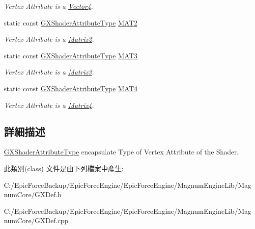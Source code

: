 \begin{DoxyCompactItemize}
\begin{DoxyCompactList}\small\item\em Vertex Attribute is a \hyperlink{class_magnum_1_1_vector4}{Vector4}. \end{DoxyCompactList}\item 
static const \hyperlink{class_magnum_1_1_g_x_shader_attribute_type}{G\+X\+Shader\+Attribute\+Type} \hyperlink{class_magnum_1_1_g_x_shader_attribute_type_a0ccf3aeafcaa766f5dfb4874f8713bd2}{M\+A\+T2}\hypertarget{class_magnum_1_1_g_x_shader_attribute_type_a0ccf3aeafcaa766f5dfb4874f8713bd2}{}\label{class_magnum_1_1_g_x_shader_attribute_type_a0ccf3aeafcaa766f5dfb4874f8713bd2}

\begin{DoxyCompactList}\small\item\em Vertex Attribute is a \hyperlink{class_magnum_1_1_matrix2}{Matrix2}. \end{DoxyCompactList}\item 
static const \hyperlink{class_magnum_1_1_g_x_shader_attribute_type}{G\+X\+Shader\+Attribute\+Type} \hyperlink{class_magnum_1_1_g_x_shader_attribute_type_aee69966e47d877eaad7887b1e986332f}{M\+A\+T3}\hypertarget{class_magnum_1_1_g_x_shader_attribute_type_aee69966e47d877eaad7887b1e986332f}{}\label{class_magnum_1_1_g_x_shader_attribute_type_aee69966e47d877eaad7887b1e986332f}

\begin{DoxyCompactList}\small\item\em Vertex Attribute is a \hyperlink{class_magnum_1_1_matrix3}{Matrix3}. \end{DoxyCompactList}\item 
static const \hyperlink{class_magnum_1_1_g_x_shader_attribute_type}{G\+X\+Shader\+Attribute\+Type} \hyperlink{class_magnum_1_1_g_x_shader_attribute_type_abbbc91e002fd2eff0375d9a0f9bd5e15}{M\+A\+T4}\hypertarget{class_magnum_1_1_g_x_shader_attribute_type_abbbc91e002fd2eff0375d9a0f9bd5e15}{}\label{class_magnum_1_1_g_x_shader_attribute_type_abbbc91e002fd2eff0375d9a0f9bd5e15}

\begin{DoxyCompactList}\small\item\em Vertex Attribute is a \hyperlink{class_magnum_1_1_matrix4}{Matrix4}. \end{DoxyCompactList}\end{DoxyCompactItemize}


\subsection{詳細描述}
\hyperlink{class_magnum_1_1_g_x_shader_attribute_type}{G\+X\+Shader\+Attribute\+Type} encapsulate Type of Vertex Attribute of the Shader. 

此類別(class) 文件是由下列檔案中產生\+:\begin{DoxyCompactItemize}
\item 
C\+:/\+Epic\+Force\+Backup/\+Epic\+Force\+Engine/\+Epic\+Force\+Engine/\+Magnum\+Engine\+Lib/\+Magnum\+Core/G\+X\+Def.\+h\item 
C\+:/\+Epic\+Force\+Backup/\+Epic\+Force\+Engine/\+Epic\+Force\+Engine/\+Magnum\+Engine\+Lib/\+Magnum\+Core/G\+X\+Def.\+cpp\end{DoxyCompactItemize}
